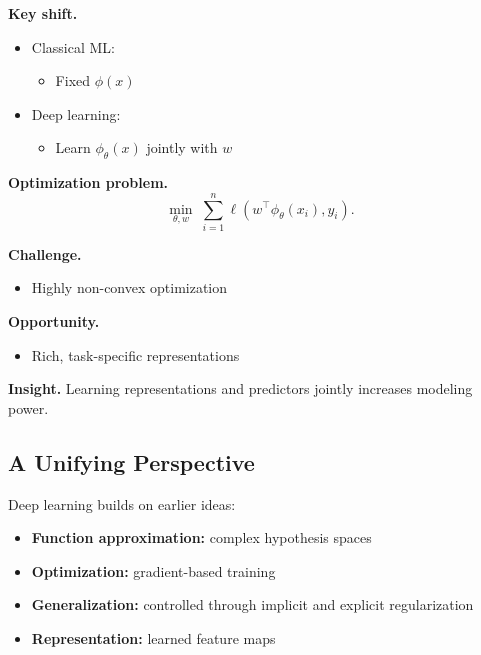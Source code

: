 \medskip

\noindent
\textbf{Key shift.}

\begin{itemize}
    \item Classical ML:
    \begin{itemize}
        \item Fixed $\phi(x)$
    \end{itemize}

    \item Deep learning:
    \begin{itemize}
        \item Learn $\phi_\theta(x)$ jointly with $w$
    \end{itemize}
\end{itemize}

\medskip

\noindent
\textbf{Optimization problem.}
\[
\min_{\theta, w} \; \sum_{i=1}^n \ell(w^\top \phi_\theta(x_i), y_i).
\]

\medskip

\noindent
\textbf{Challenge.}
\begin{itemize}
    \item Highly non-convex optimization
\end{itemize}

\medskip

\noindent
\textbf{Opportunity.}
\begin{itemize}
    \item Rich, task-specific representations
\end{itemize}

\medskip

\noindent
\textbf{Insight.}  
Learning representations and predictors jointly increases modeling power.

\subsection{A Unifying Perspective}

Deep learning builds on earlier ideas:

\begin{itemize}
    \item \textbf{Function approximation:} complex hypothesis spaces
    \item \textbf{Optimization:} gradient-based training
    \item \textbf{Generalization:} controlled through implicit and explicit regularization
    \item \textbf{Representation:} learned feature maps
\end{itemize}

